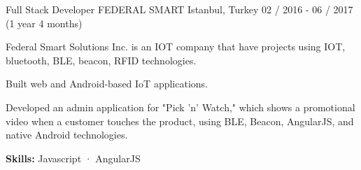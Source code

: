 \begin{cventries}
  \cventry
    {Full Stack Developer} %
    {FEDERAL SMART} %
    {Istanbul, Turkey} %
    {02 / 2016 - 06 / 2017 (1 year 4 months)}
    {
      \begin{cvitems} %
        \item {Federal Smart Solutions Inc. is an IOT company that have projects using IOT, bluetooth, BLE, beacon, RFID technologies.}
        \item {Built web and Android-based IoT applications.}
        \item {Developed an admin application for "Pick 'n' Watch," which shows a promotional video when a customer touches the product, using BLE, Beacon, AngularJS, and native Android technologies.}
        \item {\textbf {\textbf {Skills:}} Javascript · AngularJS}
      \end{cvitems}
    }

\end{cventries}
